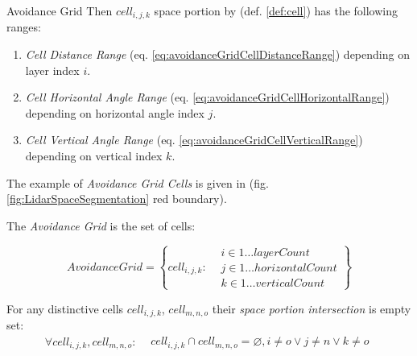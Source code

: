 \begin{definition}{Avoidance Grid}
\noindent Then $cell_{i,j,k}$ space portion by (def. \ref{def:cell}) has the following ranges:
\begin{enumerate}
    \item \emph{Cell Distance Range} (eq. \ref{eq:avoidanceGridCellDistanceRange}) depending on layer index $i$.
    
    \item \emph{Cell Horizontal Angle Range} (eq. \ref{eq:avoidanceGridCellHorizontalRange}) depending on horizontal angle index $j$.
    
    \item \emph{Cell Vertical Angle Range} (eq. \ref{eq:avoidanceGridCellVerticalRange}) depending on vertical index $k$.
\end{enumerate}

\begin{note}
	The example of \emph{Avoidance Grid Cells} is given in (fig. \ref{fig:LidarSpaceSegmentation} red boundary).
\end{note} 

The \emph{Avoidance Grid} is the set of cells:

\begin{equation}\label{eq:avoidanceGridCellSpace}
    Avoidance Grid = \left\{
    					cell_{i,j,k}:
    					\begin{aligned}
    						& i \in 1 \dots layer Count\\
    						& j \in 1 \dots horizontal Count\\
    						& k \in 1 \dots vertical Count
    					\end{aligned} 
                     \right\}
\end{equation}

\begin{note}
	For any distinctive cells $cell_{i,j,k}$, $cell_{m,n,o}$ their \emph{space portion intersection} is empty set:
	\begin{equation}
		\forall cell_{i,j,k}, cell_{m,n,o}:
		\begin{aligned}
		    &cell_{i,j,k}\cap cell_{m,n,o} = \varnothing,
		    i \neq o \lor j \neq n \lor k \neq o
		\end{aligned}
	\end{equation}
\end{note}
\end{definition}



